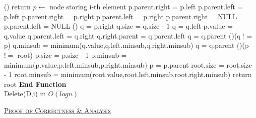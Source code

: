 \documentclass[a4 paper]{article}
\begin{document}
\begin{algorithm}[H]
\SetAlgoLined
{}
%
\Fn(){\FRecurs}
{
    {   
        return\;
    }
    $p \leftarrow $ {node storing i-th element}\;
    {
        {
            p.parent.right = p.left\;
        }
        \Else
        {
            p.parent.left = p.left\;
        }
    }
    {
        {
            p.parent.right = p.right\;
        }
        \Else
        {
            p.parent.left = p.right\;
        }
    }
    {
        {
            p.parent.right = NULL\;
        }
        \Else
        {
            p.parent.left = NULL\;
        }
    }
    \Else()
    {
        q = p.right\;
        {
            q.size = q.size - 1
            q = q.left\;
        }
        p.value = q.value\;
        q.parent.left = q.right
        {
            q.right.parent = q.parent.left\;
        }
        q = q.parent\;
        \While(){(q $!=$ p)}
        {
            q.minsub = minimum(q.value,q.left.minsub,q.right.minsub)\;
            q = q.parent\;
        }
    }
    \While(){(p $!=$ root)}
        {
            p.size = p.size - 1\;
            p.minsub = minimum(p.value,p.left.minsub,p.right.minsub)\;
            p = p.parent\;
        }
        root.size = root.size - 1
        root.minsub = minimum(root.value,root.left.minsub,root.right.minsub)\;
        return root\;
}
\textbf{End Function}\\
\caption{Delete(D,i) in $O(logn)$}
\end{algorithm}
\vspace{1mm}
\newpage
{}
\underline{\textsc{Proof of Correctness \& Analysis}}\\\\
\end{document}
